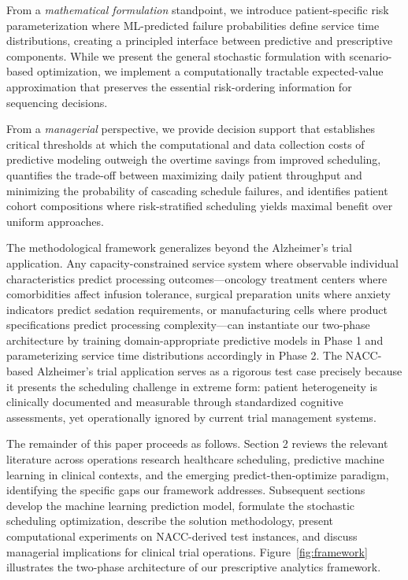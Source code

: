 From a \textit{mathematical formulation} standpoint, we introduce patient-specific risk parameterization where ML-predicted failure probabilities define service time distributions, creating a principled interface between predictive and prescriptive components. While we present the general stochastic formulation with scenario-based optimization, we implement a computationally tractable expected-value approximation that preserves the essential risk-ordering information for sequencing decisions.

From a \textit{managerial} perspective, we provide decision support that establishes critical thresholds at which the computational and data collection costs of predictive modeling outweigh the overtime savings from improved scheduling, quantifies the trade-off between maximizing daily patient throughput and minimizing the probability of cascading schedule failures, and identifies patient cohort compositions where risk-stratified scheduling yields maximal benefit over uniform approaches.

The methodological framework generalizes beyond the Alzheimer's trial application. Any capacity-constrained service system where observable individual characteristics predict processing outcomes---oncology treatment centers where comorbidities affect infusion tolerance, surgical preparation units where anxiety indicators predict sedation requirements, or manufacturing cells where product specifications predict processing complexity---can instantiate our two-phase architecture by training domain-appropriate predictive models in Phase 1 and parameterizing service time distributions accordingly in Phase 2. The NACC-based Alzheimer's trial application serves as a rigorous test case precisely because it presents the scheduling challenge in extreme form: patient heterogeneity is clinically documented and measurable through standardized cognitive assessments, yet operationally ignored by current trial management systems.

The remainder of this paper proceeds as follows. Section 2 reviews the relevant literature across operations research healthcare scheduling, predictive machine learning in clinical contexts, and the emerging predict-then-optimize paradigm, identifying the specific gaps our framework addresses. Subsequent sections develop the machine learning prediction model, formulate the stochastic scheduling optimization, describe the solution methodology, present computational experiments on NACC-derived test instances, and discuss managerial implications for clinical trial operations. Figure~\ref{fig:framework} illustrates the two-phase architecture of our prescriptive analytics framework.

